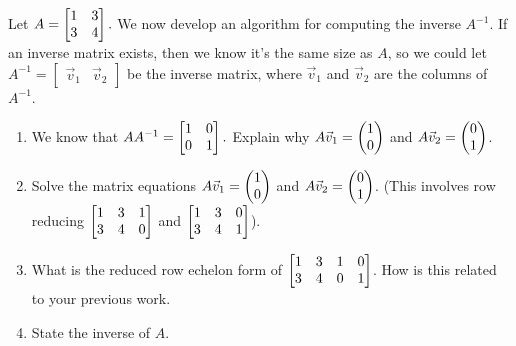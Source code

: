 \begin{problem*}
Let 
$A=
\begin{bmatrix}
\begin{matrix} 1\\3 \end{matrix}&
\begin{matrix} 3\\4 \end{matrix}
\end{bmatrix}
.$
We now develop an algorithm for computing the inverse $A^{-1}$.
If an inverse matrix exists, then we know it's the same size as $A$, so we could let $A^{-1}=\begin{bmatrix}\vec v_1 & \vec v_2\end{bmatrix}$ be the inverse matrix, where $\vec v_1$ and $\vec v_2$ are the columns of $A^{-1}$.  
\begin{enumerate}
 \item  We know that $A A^{-1} = \begin{bmatrix}\begin{matrix} 1\\0 \end{matrix}&\begin{matrix} 0\\1 \end{matrix}\end{bmatrix}.$ 
Explain why $A\vec v_1=\begin{pmatrix} 1\\0 \end{pmatrix}$ and $A\vec v_2=\begin{pmatrix} 0\\1 \end{pmatrix}$.
 \item Solve the matrix equations $A\vec v_1=\begin{pmatrix} 1\\0 \end{pmatrix}$ and $A\vec v_2=\begin{pmatrix} 0\\1 \end{pmatrix}$.  (This involves row reducing 
$
\begin{bmatrix}
\begin{matrix} 1\\3 \end{matrix}&
\begin{matrix} 3\\4 \end{matrix}&
\begin{matrix} 1\\0 \end{matrix}
\end{bmatrix}
$
and 
$
\begin{bmatrix}
\begin{matrix} 1\\3 \end{matrix}&
\begin{matrix} 3\\4 \end{matrix}&
\begin{matrix} 0\\1 \end{matrix}
\end{bmatrix}
$).
 \item What is the reduced row echelon form of
$
\begin{bmatrix}
\begin{matrix} 1\\3 \end{matrix}&
\begin{matrix} 3\\4 \end{matrix}&
\begin{matrix} 1\\0 \end{matrix}&
\begin{matrix} 0\\1 \end{matrix}
\end{bmatrix}
$.  How is this related to your previous work.
 \item State the inverse of $A$. 
\end{enumerate}

\end{problem*}



